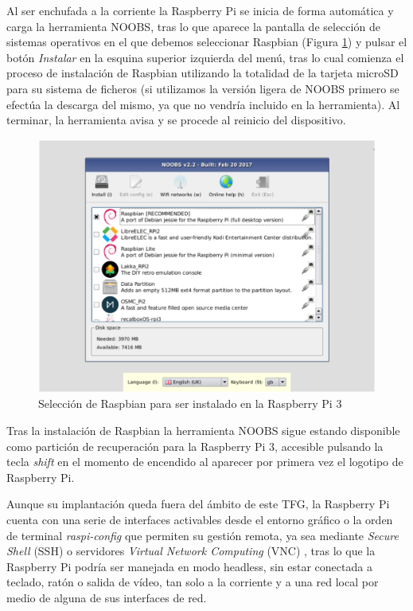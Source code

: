 \begin{appendices}
Al ser enchufada a la corriente la Raspberry Pi se inicia de forma automática y carga la herramienta NOOBS, tras lo que aparece la pantalla de selección de sistemas operativos en el que debemos seleccionar Raspbian (Figura \ref{NOOBS}) y pulsar el botón \emph{Instalar} en la esquina superior izquierda del menú, tras lo cual comienza el proceso de instalación de Raspbian utilizando la totalidad de la tarjeta microSD para su sistema de ficheros (si utilizamos la versión ligera de NOOBS primero se efectúa la descarga del mismo, ya que no vendría incluido en la herramienta). Al terminar, la herramienta avisa y se procede al reinicio del dispositivo.

\begin{figure}[!t]
\begin{center}
\includegraphics[width=0.75\linewidth]{./X_Anexos/Img/NOOBS.png}
\end{center}
\caption{Selección de Raspbian para ser instalado en la Raspberry Pi 3}
\label{NOOBS}
\end{figure}

Tras la instalación de Raspbian la herramienta NOOBS sigue estando disponible como partición de recuperación para la Raspberry Pi 3, accesible pulsando la tecla \emph{shift} en el momento de encendido al aparecer por primera vez el logotipo de Raspberry Pi.

Aunque su implantación queda fuera del ámbito de este TFG, la Raspberry Pi cuenta con una serie de interfaces activables desde el entorno gráfico o la orden de terminal \emph{raspi-config} que permiten su gestión remota, ya sea mediante \emph{Secure Shell} (\acrshort{SSH}) o servidores \emph{Virtual Network Computing} (\acrshort{VNC}) \cite{RasPiVNC}, tras lo que la Raspberry Pi podría ser manejada en modo headless, sin estar conectada a teclado, ratón o salida de vídeo, tan solo a la corriente y a una red local por medio de alguna de sus interfaces de red.


\end{appendices}
